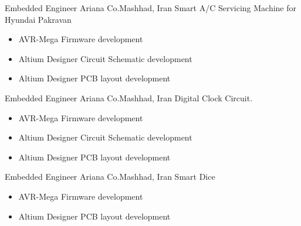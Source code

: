 	{Embedded Engineer}
	{Ariana Co.}{Mashhad, Iran}
	{
         \newline
        Smart A/C Servicing Machine for Hyundai Pakravan
        }
        {\begin{itemize}
            \item AVR-Mega Firmware development
            \item Altium Designer Circuit Schematic development
            \item Altium Designer  PCB layout development 
        \end{itemize}}


	{Embedded Engineer}
	{Ariana Co.}{Mashhad, Iran}
	{
        \newline 
        Digital Clock Circuit.
        }
        {
        \begin{itemize}
            \item AVR-Mega Firmware development
            \item Altium Designer Circuit Schematic development
            \item Altium Designer  PCB layout development 
        \end{itemize}
        }

	{Embedded Engineer}
	{Ariana Co.}{Mashhad, Iran}
	{
        \newline 
        Smart Dice
        }
        {
        \begin{itemize}
            \item AVR-Mega Firmware development
            \item Altium Designer  PCB layout development 
        \end{itemize}
        }


 

